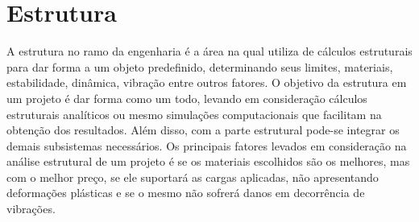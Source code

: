 \section{Estrutura}
A estrutura no ramo da engenharia é a área na qual utiliza de cálculos estruturais para dar forma a um objeto predefinido, determinando seus limites, materiais, estabilidade, dinâmica, vibração entre outros fatores. O objetivo da estrutura em um projeto é dar forma como um todo, levando em consideração cálculos estruturais analíticos ou mesmo simulações computacionais que facilitam na obtenção dos resultados. Além disso, com a parte estrutural pode-se integrar os demais subsistemas necessários.
Os principais fatores levados em consideração na análise estrutural de um projeto é se os materiais escolhidos são os melhores, mas com o melhor preço, se ele suportará as cargas aplicadas, não apresentando deformações plásticas e se o mesmo não sofrerá danos em decorrência de vibrações.

